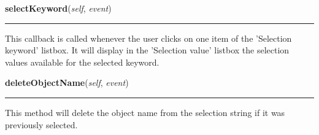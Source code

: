     \vspace{0.5ex}

\hspace{.8\funcindent}\begin{boxedminipage}{\funcwidth}

    \raggedright \textbf{selectKeyword}(\textit{self}, \textit{event})

    \vspace{-1.5ex}

    \rule{\textwidth}{0.5\fboxrule}
\setlength{\parskip}{2ex}
    This callback is called whenever the user clicks on one item of the 
    'Selection keyword' listbox. It will display in the 'Selection value' 
    listbox the selection values available for the selected keyword.

\setlength{\parskip}{1ex}
    \end{boxedminipage}

    \label{nMOLDYN:GUI:SelectionDialog:SelectionDialog:deleteObjectName}

    \vspace{0.5ex}

\hspace{.8\funcindent}\begin{boxedminipage}{\funcwidth}

    \raggedright \textbf{deleteObjectName}(\textit{self}, \textit{event})

    \vspace{-1.5ex}

    \rule{\textwidth}{0.5\fboxrule}
\setlength{\parskip}{2ex}
    This method will delete the object name from the selection string if it
    was previously selected.

\setlength{\parskip}{1ex}
    \end{boxedminipage}

    \label{nMOLDYN:GUI:SelectionDialog:SelectionDialog:selectValue}

    \vspace{0.5ex}


